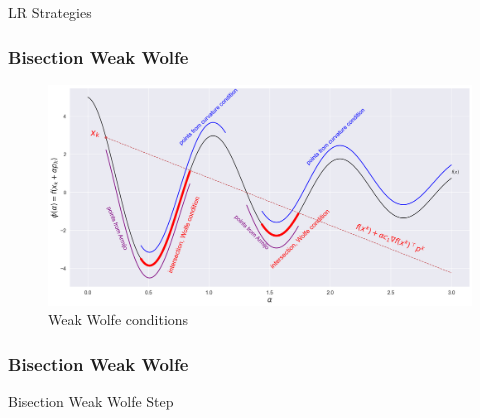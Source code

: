\documentclass[pdf,10pt]{beamer}
\begin{document}
\begin{section}{LR Strategies}
 \begin{frame}
   \frametitle{Bisection Weak Wolfe}
   \begin{figure}[H]
     \centering
     \includegraphics[width=\textwidth,keepaspectratio]{../data/weak_wolfe.png}
     \caption[Weak Wolfe conditions]{Weak Wolfe conditions}\label{fig:weak_wolfe}
   \end{figure}
 \end{frame}

 \begin{frame}
   \frametitle{Bisection Weak Wolfe}
   \begin{algorithm}[H]
     \tiny
     \caption{Bisection Weak Wolfe Step}\label{algo:lr_biwolfe}
     \begin{algorithmic}[0]

         
         

        

        

        

       \Else{}
        
       \EndIf{}
       \Else{}
       \State{\Return{$\alpha$}}
       \EndIf{}
       \EndFor{}
       \State{\Return{$\alpha$}}


\end{algorithmic}
\end{algorithm}
\end{frame}
\end{section}
\end{document}
